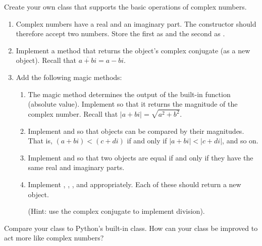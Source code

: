 \begin{problem}
Create your own  class that supports the basic operations of complex numbers.
\begin{enumerate}
\item Complex numbers have a real and an imaginary part. The constructor should therefore accept two numbers. Store the first as  and the second as .
\item Implement a  method that returns the object's complex conjugate (as a new  object). Recall that $\overline{a + bi} = a - bi$.
\item Add the following magic methods:
\begin{enumerate}
\item The  magic method determines the output of the built-in  function (absolute value). Implement  so that it returns the magnitude of the complex number. Recall that $|a+bi| = \sqrt{a^2+b^2}$.
\item Implement  and  so that  objects can be compared by their magnitudes. That is, $(a+bi) < (c+di)$ if and only if $|a+bi| < |c+di|$, and so on.
\item Implement  and  so that two  objects are equal if and only if they have the same real and imaginary parts.
\item Implement , , , and  appropriately.
Each of these should return a new  object.

(Hint: use the complex conjugate to implement division).
\end{enumerate}
\end{enumerate}
Compare your class to Python's built-in  class.
How can your class be improved to act more like complex numbers?
\end{problem}

